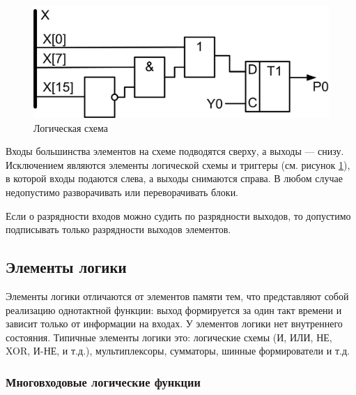 \begin{figure}[!ht]
    \centering
    \includegraphics{fig/logic}
    \caption{Логическая схема}
    \label{fig::ch::practice::logic}
\end{figure}

Входы большинства элементов на схеме подводятся сверху, а выходы --- снизу. Исключением являются элементы логической схемы и триггеры (см. рисунок \ref{fig::ch::practice::logic}), в которой входы подаются слева, а выходы снимаются справа. В любом случае недопустимо разворачивать или переворачивать блоки.

Если о разрядности входов можно судить по разрядности выходов, то допустимо подписывать только разрядности выходов элементов.


\subsection{Элементы логики}

Элементы логики отличаются от элементов памяти тем, что представляют собой реализацию однотактной функции: выход формируется за один такт времени и зависит только от информации на входах. У элементов логики нет внутреннего состояния. Типичные элементы логики это: логические схемы (И, ИЛИ, НЕ, XOR, И-НЕ, и т.д.), мультиплексоры, сумматоры, шинные формирователи и т.д.


\subsubsection{Многовходовые логические функции}

